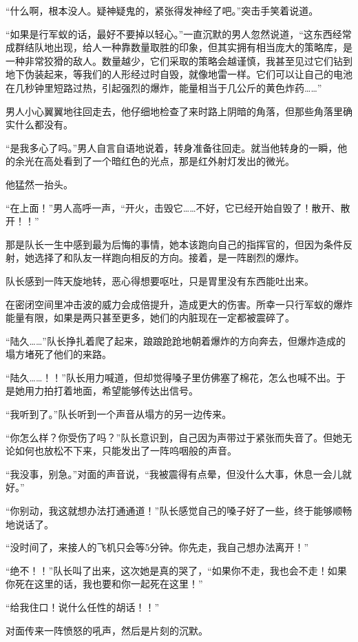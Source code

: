“什么啊，根本没人。疑神疑鬼的，紧张得发神经了吧。”突击手笑着说道。

“如果是行军蚁的话，最好不要掉以轻心。”一直沉默的男人忽然说道，“这东西经常成群结队地出现，给人一种靠数量取胜的印象，但其实拥有相当庞大的策略库，是一种非常狡猾的敌人。数量越少，它们采取的策略会越谨慎，我甚至见过它们钻到地下伪装起来，等我们的人形经过时自毁，就像地雷一样。它们可以让自己的电池在几秒钟里短路过热，引起强烈的爆炸，能量相当于几公斤的黄色炸药……”

男人小心翼翼地往回走去，他仔细地检查了来时路上阴暗的角落，但那些角落里确实什么都没有。

“是我多心了吗。”男人自言自语地说着，转身准备往回走。就当他转身的一瞬，他的余光在高处看到了一个暗红色的光点，那是红外射灯发出的微光。

他猛然一抬头。

“在上面！”男人高呼一声，“开火，击毁它……不好，它已经开始自毁了！散开、散开！！”

那是队长一生中感到最为后悔的事情，她本该跑向自己的指挥官的，但因为条件反射，她选择了和队友一样跑向相反的方向。接着，是一阵剧烈的爆炸。

队长感到一阵天旋地转，恶心得想要呕吐，只是胃里没有东西能吐出来。

在密闭空间里冲击波的威力会成倍提升，造成更大的伤害。所幸一只行军蚁的爆炸能量有限，如果是两只甚至更多，她们的内脏现在一定都被震碎了。

“陆久……”队长挣扎着爬了起来，踉踉跄跄地朝着爆炸的方向奔去，但爆炸造成的塌方堵死了他们的来路。

“陆久……！！”队长用力喊道，但却觉得嗓子里仿佛塞了棉花，怎么也喊不出。于是她用力拍打着地面，希望能够传达出信号。

“我听到了。”队长听到一个声音从塌方的另一边传来。

“你怎么样？你受伤了吗？”队长意识到，自己因为声带过于紧张而失音了。但她无论如何也放松不下来，只能发出了一阵呜咽般的声音。

“我没事，别急。”对面的声音说，“我被震得有点晕，但没什么大事，休息一会儿就好。”

“你别动，我这就想办法打通通道！”队长感觉自己的嗓子好了一些，终于能够顺畅地说话了。

“没时间了，来接人的飞机只会等5分钟。你先走，我自己想办法离开！”

“绝不！！”队长叫了出来，这次她是真的哭了，“如果你不走，我也会不走！如果你死在这里的话，我也要和你一起死在这里！”

“给我住口！说什么任性的胡话！！”

对面传来一阵愤怒的吼声，然后是片刻的沉默。

